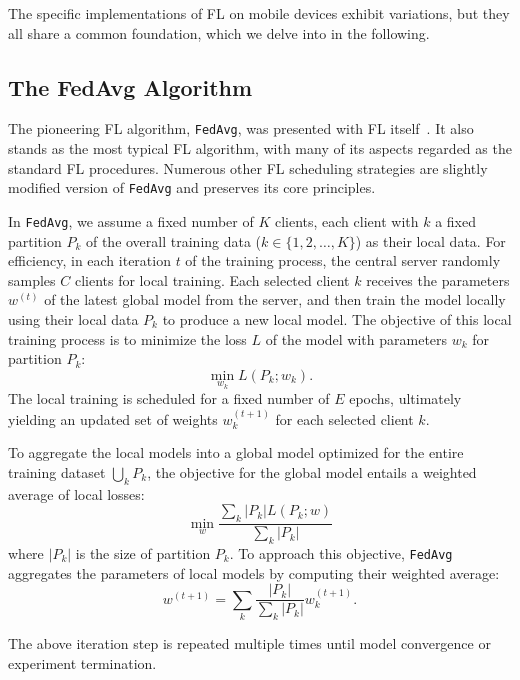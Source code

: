 \documentclass[conference]{IEEEtran}
\begin{document}
The specific implementations of FL on mobile devices exhibit variations,
but they all share a common foundation,
which we delve into in the following.

\subsection{The FedAvg Algorithm}

\newcommand{\FedAvg}{\texttt{FedAvg}}

The pioneering FL algorithm, \FedAvg{},
was presented with FL itself~\cite{mcmahan2017communication}.
It also stands as the most typical FL algorithm,
with many of its aspects regarded as the standard FL procedures.
Numerous other FL scheduling strategies are slightly modified version of
\FedAvg{} and preserves its core principles.

In \FedAvg{},
we assume a fixed number of $K$ clients,
each client with $k$ a fixed partition $P_k$ of
the overall training data ($k \in \{1, 2, \dots, K\}$) as their local data.
For efficiency,
in each iteration $t$ of the training process,
the central server randomly samples $C$ clients for local training.
Each selected client $k$ receives the parameters $w^{(t)}$ of
the latest global model from the server,
and then train the model locally using their local data $P_k$
to produce a new local model.
The objective of this local training process is to minimize the loss $L$ of
the model with parameters $w_k$ for partition $P_k$:
\begin{equation}
    \min_{w_k} L(P_k;w_k).
\end{equation}
The local training is scheduled for a fixed number of $E$ epochs,
ultimately yielding an updated set of weights $w_k^{(t+1)}$ for
each selected client $k$.

To aggregate the local models into a global model
optimized for the entire training dataset $\bigcup_k P_k$,
the objective for the global model entails
a weighted average of local losses:
\begin{equation}
    \min_{w} \frac{\sum_k |P_k|L(P_k;w)}{\sum_k |P_k|}
\end{equation}
where $|P_k|$ is the size of partition $P_k$.
To approach this objective,
\FedAvg{} aggregates the parameters of local models by
computing their weighted average:
\begin{equation}
    w^{(t+1)}=\sum_k \frac{|P_k|}{\sum_k |P_k|}w_k^{(t+1)}.
\end{equation}

The above iteration step is repeated multiple times until
model convergence or experiment termination.
\end{document}
